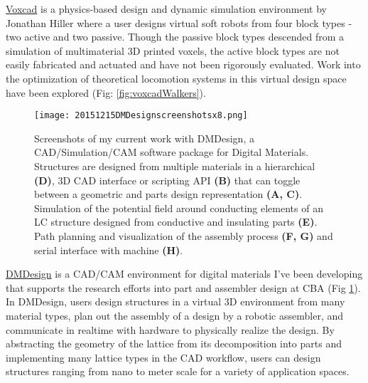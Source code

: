{\href{http://www.voxcad.com/}{Voxcad} is a physics-based design and dynamic simulation environment by Jonathan Hiller where a user designs virtual soft robots from four block types - two active and two passive\cite{Hiller2014a}.  Though the passive block types descended from a simulation of multimaterial 3D printed voxels, the active block types are not easily fabricated and actuated\cite{Hiller2012} and have not been rigorously evaluated.  Work into the optimization of theoretical locomotion systems in this virtual design space have been explored (Fig: \ref{fig:voxcadWalkers})\cite{Cheney2013b}\cite{Cheney2013}\cite{Cheney2015}.
\\

\begin{figure}
  \texttt{[image: 20151215DMDesignscreenshotsx8.png]}
  \caption{Screenshots of my current work with DMDesign, a CAD/Simulation/CAM software package for Digital Materials. Structures are designed from multiple materials in a hierarchical \textbf{(D)}, 3D CAD interface or scripting API \textbf{(B)} that can toggle between a geometric and parts design representation \textbf{(A, C)}. Simulation of the potential field around conducting elements of an LC structure designed from conductive and insulating parts \textbf{(E)}. Path planning and visualization of the assembly process \textbf{(F, G)} and serial interface with machine \textbf{(H)}.}
  \label{fig: designAssemblyGUIWide}
\end{figure}
\href{http://dma.cba.mit.edu/dmdesign/}{DMDesign} is a CAD/CAM environment for digital materials I've been developing that supports the research efforts into part and assembler design at CBA (Fig \ref{fig: designAssemblyGUIWide}).  In DMDesign, users design structures in a virtual 3D environment from many material types, plan out the assembly of a design by a robotic assembler, and communicate in realtime with hardware to physically realize the design\cite{LangfordWillGhassaeiAmandaGershenfeld2016}.  By abstracting the geometry of the lattice from its decomposition into parts and implementing many lattice types in the CAD workflow, users can design structures ranging from nano to meter scale for a variety of application spaces.

}